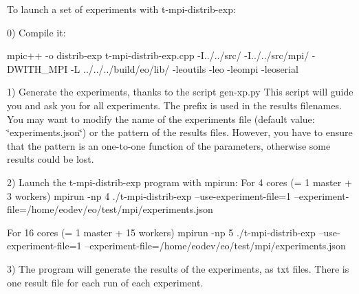 To launch a set of experiments with t-\/mpi-\/distrib-\/exp\+:

0) Compile it\+: \begin{DoxyVerb}mpic++ -o distrib-exp t-mpi-distrib-exp.cpp -I../../src/ -I../../src/mpi/ -DWITH_MPI -L ../../../build/eo/lib/ -leoutils -leo -leompi -leoserial
\end{DoxyVerb}


1) Generate the experiments, thanks to the script gen-\/xp.\+py This script will guide you and ask you for all experiments. The prefix is used in the results filenames. You may want to modify the name of the experiments file (default value\+: \char`\"{}experiments.\+json\char`\"{}) or the pattern of the results files. However, you have to ensure that the pattern is an one-\/to-\/one function of the parameters, otherwise some results could be lost.

2) Launch the t-\/mpi-\/distrib-\/exp program with mpirun\+: For 4 cores (= 1 master + 3 workers) mpirun -\/np 4 ./t-\/mpi-\/distrib-\/exp --use-\/experiment-\/file=1 --experiment-\/file=/home/eodev/eo/test/mpi/experiments.json

For 16 cores (= 1 master + 15 workers) mpirun -\/np 5 ./t-\/mpi-\/distrib-\/exp --use-\/experiment-\/file=1 --experiment-\/file=/home/eodev/eo/test/mpi/experiments.json

3) The program will generate the results of the experiments, as txt files. There is one result file for each run of each experiment. 